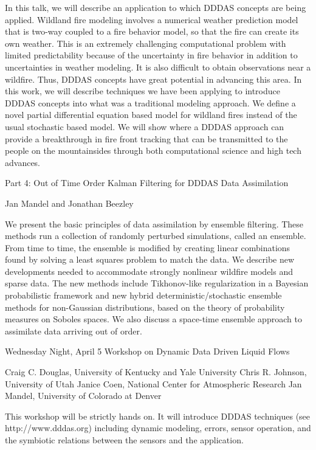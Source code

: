 \documentclass{report}
\begin{document}
In this talk, we will describe an application to which DDDAS concepts are
being applied. Wildland fire modeling involves a numerical weather
prediction model that is two-way coupled to a fire behavior model, so
that the fire can create its own weather. This is an extremely
challenging computational problem with limited predictability because of
the uncertainty in fire behavior in addition to uncertainties in weather
modeling. It is also difficult to obtain observations near a wildfire.
Thus, DDDAS concepts have great potential in advancing this area. In this
work, we will describe techniques we have been applying to introduce
DDDAS concepts into what was a traditional modeling approach. We define a
novel partial differential equation based model for wildland fires
instead of the usual stochastic based model. We will show where a DDDAS
approach can provide a breakthrough in fire front tracking that can be
transmitted to the people on the mountainsides through both computational
science and high tech advances.


Part 4: Out of Time Order Kalman Filtering for DDDAS Data Assimilation

Jan Mandel and Jonathan Beezley

We present the basic principles of data assimilation by ensemble
filtering. These methods run a collection of randomly perturbed
simulations, called an ensemble. From time to time, the ensemble is
modified by creating linear combinations found by solving a least squares
problem to match the data. We describe new developments needed to
accommodate strongly nonlinear wildfire models and sparse data. The new
methods include Tikhonov-like regularization in a Bayesian probabilistic
framework and new hybrid deterministic/stochastic ensemble methods for
non-Gaussian distributions, based on the theory of probability measures
on Soboles spaces. We also discuss a space-time ensemble approach to
assimilate data arriving out of order.


Wednesday Night, April 5 Workshop on Dynamic Data Driven Liquid Flows

Craig C. Douglas, University of Kentucky and Yale University
Chris R. Johnson, University of Utah
Janice Coen, National Center for Atmospheric Research
Jan Mandel, University of Colorado at Denver

This workshop will be strictly hands on. It will introduce DDDAS
techniques (see http://www.dddas.org) including dynamic modeling, errors,
sensor operation, and the symbiotic relations between the sensors and the
application.
\end{document}
